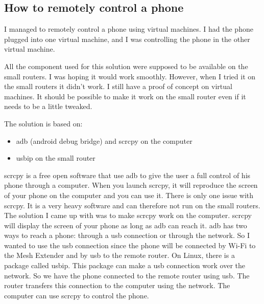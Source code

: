 \subsection{How to remotely control a phone}

I managed to remotely control a phone using virtual machines. I had the phone plugged into one virtual machine, and I was controlling the phone in the other virtual machine.

All the component used for this solution were supposed to be available on the small routers. I was hoping it would work smoothly. However, when I tried it on the small routers it didn't work. I still have a proof of concept on virtual machines. It should be possible to make it work on the small router even if it needs to be a little tweaked.

The solution is based on:
\begin{itemize}
	\item adb (android debug bridge) and scrcpy on the computer
	\item usbip on the small router
\end{itemize}

scrcpy is a free open software that use adb to give the user a full control of his phone through a computer. When you launch scrcpy, it will reproduce the screen of your phone on the computer and you can use it.
There is only one issue with scrcpy. It is a very heavy software and can therefore not run on the small routers. 
The solution I came up with was to make scrcpy work on the computer. scrcpy will display the screen of your phone as long as adb can reach it. adb has two ways to reach a phone: through a usb connection or through the network. So I wanted to use the usb connection since the phone will be connected by Wi-Fi to the Mesh Extender and by usb to the remote router. On Linux, there is a package called usbip. This package can make a usb connection work over the network. So we have the phone connected to the remote router using usb. The router transfers this connection to the computer using the network. The computer can use scrcpy to control the phone.



 


